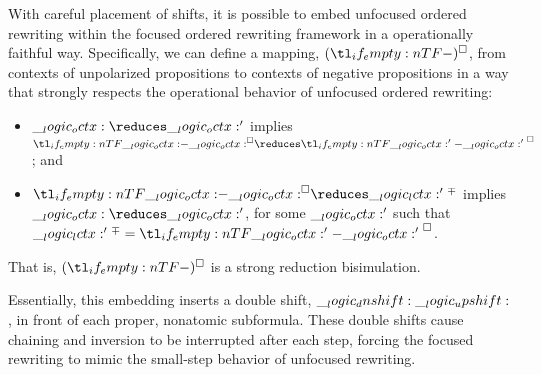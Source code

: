 With careful placement of shifts, it is possible to embed unfocused ordered rewriting within the focused ordered rewriting framework in a operationally faithful way.
Specifically, we can define a mapping, $\embed*{}$, from contexts of unpolarized propositions to contexts of negative propositions in a way that strongly respects the operational behavior of unfocused ordered rewriting:
\begin{itemize}[noitemsep]
\item $\octx \reduces \octx'$ implies $\embed{\octx} \reduces \embed{\octx'{}}$; and
\item $\embed{\octx} \reduces \np{\lctx'{}}$ implies $\octx \reduces \octx'$, for some $\__logic_octx:'$ such that $\np{\lctx'{}} = \embed{\octx'{}}$.
\end{itemize}
That is, $\embed*{}$ is a strong reduction bisimulation\textcite{Sangiorgi+Walker:CUP03}.

Essentially, this embedding inserts a double shift, $\__logic_dnshift: \__logic_upshift:$, in front of each proper, nonatomic subformula.
These double shifts cause chaining and inversion to be interrupted after each step, forcing the focused rewriting to mimic the small-step behavior of unfocused rewriting.

